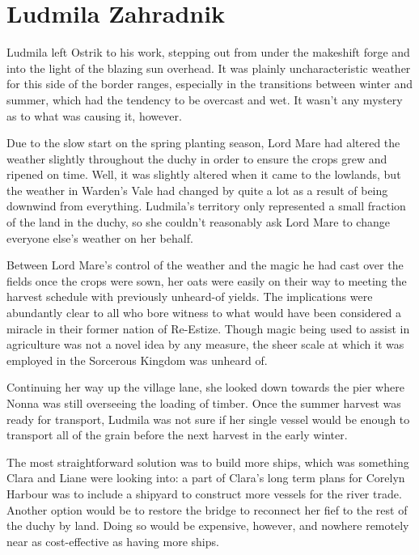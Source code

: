 \chapter{Ludmila Zahradnik}

Ludmila left Ostrik to his work, stepping out from under the makeshift forge and into the light of the blazing sun overhead. It was plainly uncharacteristic weather for this side of the border ranges, especially in the transitions between winter and summer, which had the tendency to be overcast and wet. It wasn’t any mystery as to what was causing it, however.

 

Due to the slow start on the spring planting season, Lord Mare had altered the weather slightly throughout the duchy in order to ensure the crops grew and ripened on time. Well, it was slightly altered when it came to the lowlands, but the weather in Warden’s Vale had changed by quite a lot as a result of being downwind from everything. Ludmila’s territory only represented a small fraction of the land in the duchy, so she couldn’t reasonably ask Lord Mare to change everyone else’s weather on her behalf.

 

Between Lord Mare’s control of the weather and the magic he had cast over the fields once the crops were sown, her oats were easily on their way to meeting the harvest schedule with previously unheard-of yields. The implications were abundantly clear to all who bore witness to what would have been considered a miracle in their former nation of Re-Estize. Though magic being used to assist in agriculture was not a novel idea by any measure, the sheer scale at which it was employed in the Sorcerous Kingdom was unheard of.

 

Continuing her way up the village lane, she looked down towards the pier where Nonna was still overseeing the loading of timber. Once the summer harvest was ready for transport, Ludmila was not sure if her single vessel would be enough to transport all of the grain before the next harvest in the early winter.

 

The most straightforward solution was to build more ships, which was something Clara and Liane were looking into: a part of Clara’s long term plans for Corelyn Harbour was to include a shipyard to construct more vessels for the river trade. Another option would be to restore the bridge to reconnect her fief to the rest of the duchy by land. Doing so would be expensive, however, and nowhere remotely near as cost-effective as having more ships.


